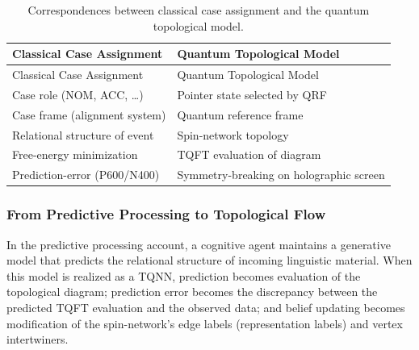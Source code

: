\documentclass[
]{article}
\begin{document}
\begin{longtable}[]{@{}
  >{\raggedright\arraybackslash}p{}
  >{\raggedright\arraybackslash}p{}@{}}
\caption{Correspondences between classical case assignment and the
quantum topological
model.}\label{tbl:classical-quantum-case}\tabularnewline
\toprule\noalign{}
\begin{minipage}[b]{\linewidth}\raggedright
Classical Case Assignment
\end{minipage} & \begin{minipage}[b]{\linewidth}\raggedright
Quantum Topological Model
\end{minipage} \\
\midrule\noalign{}
\endfirsthead
\toprule\noalign{}
\begin{minipage}[b]{\linewidth}\raggedright
Classical Case Assignment
\end{minipage} & \begin{minipage}[b]{\linewidth}\raggedright
Quantum Topological Model
\end{minipage} \\
\midrule\noalign{}
\endhead
\bottomrule\noalign{}
\endlastfoot
Case role (NOM, ACC, \ldots) & Pointer state selected by QRF \\
Case frame (alignment system) & Quantum reference frame \\
Relational structure of event & Spin-network topology \\
Free-energy minimization & TQFT evaluation of diagram \\
Prediction-error (P600/N400) & Symmetry-breaking on holographic
screen \\
\end{longtable}

\subsubsection{From Predictive Processing to Topological
Flow}\label{from-predictive-processing-to-topological-flow}

In the predictive processing account, a cognitive agent maintains a
generative model that predicts the relational structure of incoming
linguistic material. When this model is realized as a TQNN, prediction
becomes evaluation of the topological diagram; prediction error becomes
the discrepancy between the predicted TQFT evaluation and the observed
data; and belief updating becomes modification of the spin-network's
edge labels (representation labels) and vertex intertwiners.
\end{document}
